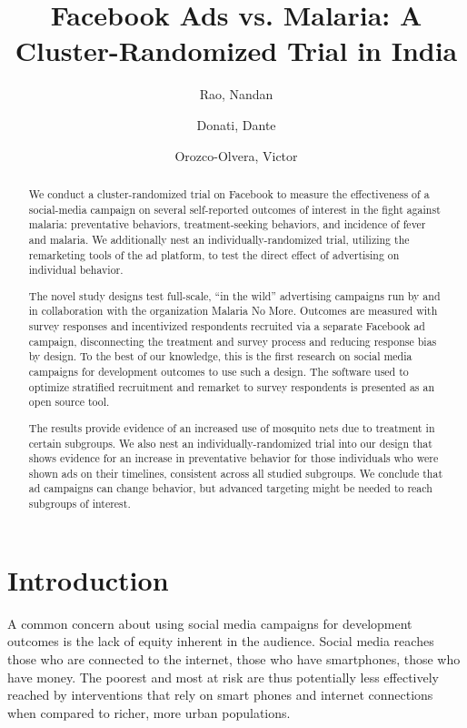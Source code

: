 \documentclass[a4paper,12pt]{article}
\author{
  Rao, Nandan\\
  \and
  Donati, Dante\\
  \and
  Orozco-Olvera, Victor
}
\title{Facebook Ads vs. Malaria: A Cluster-Randomized Trial in India}
\begin{document}
\maketitle

\begin{abstract}
We conduct a cluster-randomized trial on Facebook to measure the effectiveness of a social-media campaign on several self-reported outcomes of interest in the fight against malaria: preventative behaviors, treatment-seeking behaviors, and incidence of fever and malaria. We additionally nest an individually-randomized trial, utilizing the remarketing tools of the ad platform, to test the direct effect of advertising on individual behavior.

The novel study designs test full-scale, ``in the wild'' advertising campaigns run by and in collaboration with the organization Malaria No More. Outcomes are measured with survey responses and incentivized respondents recruited via a separate Facebook ad campaign, disconnecting the treatment and survey process and reducing response bias by design. To the best of our knowledge, this is the first research on social media campaigns for development outcomes to use such a design. The software used to optimize stratified recruitment and remarket to survey respondents is presented as an open source tool.

The results provide evidence of an increased use of mosquito nets due to treatment in certain subgroups. We also nest an individually-randomized trial into our design that shows evidence for an increase in preventative behavior for those individuals who were shown ads on their timelines, consistent across all studied subgroups. We conclude that ad campaigns can change behavior, but advanced targeting might be needed to reach subgroups of interest.



\end{abstract}

\clearpage

\section{Introduction}

A common concern about using social media campaigns for development outcomes is the lack of equity inherent in the audience. Social media reaches those who are connected to the internet, those who have smartphones, those who have money. The poorest and most at risk are thus potentially less effectively reached by interventions that rely on smart phones and internet connections when compared to richer, more urban populations.
\end{document}

